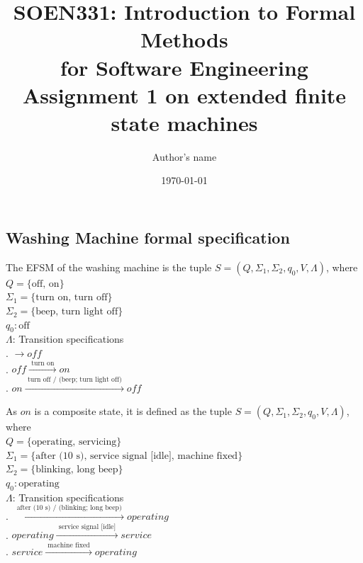 \documentclass[12pt]{article}
\title{SOEN331: Introduction to Formal Methods\\for Software Engineering\\
Assignment 1 on extended finite state machines}
\author{Author's name}
\date{\today}
\begin{document}
\begin{spacing}{1.5}

\maketitle

\section{Washing Machine formal specification}

\noindent The EFSM of the washing machine is the tuple $S = (Q, \Sigma_1, \Sigma_2, q_0, V, \Lambda)$, where\\
\noindent $Q = \{\text {off, on}\}$\\
\noindent $\Sigma_1 = \{\text {turn on, turn off}\}$\\
\noindent $\Sigma_2 = \{\text {beep, turn light off}\}$\\
\noindent $q_0: \text{off}$\\
\noindent $\Lambda$: Transition specifications\\
. $\rightarrow off $\\
. $off \xrightarrow {\text { turn on }} on$\\
. $on \xrightarrow {\text { turn off / (beep; turn light off) }} off$\\
\newpage

\noindent As $on$ is a composite state, it is defined as the tuple $S = (Q, \Sigma_1, \Sigma_2, q_0, V, \Lambda)$, where\\
\noindent $Q = \{\text {operating, servicing}\}$\\
\noindent $\Sigma_1 = \{\text {after (10 s), service signal [idle], machine fixed}\}$\\
\noindent $\Sigma_2 = \{\text {blinking, long beep}\}$\\
\noindent $q_0: \text{operating}$\\
\noindent $\Lambda$: Transition specifications\\
. $\xrightarrow {\text { after (10 s) / (blinking; long beep) }} operating$\\
. $operating \xrightarrow {\text { service signal [idle] }} service$\\
. $service \xrightarrow {\text { machine fixed }} operating$\\


\end{spacing}
\end{document}
